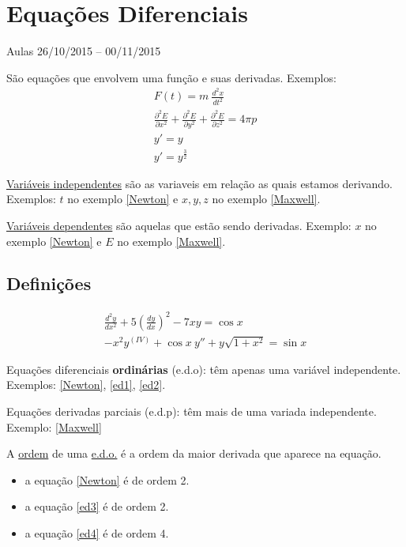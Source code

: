\documentclass[12pt,openany, letterpaper]{book}
\begin{document}
{{\chapter{Equações Diferenciais}{Aulas 26/10/2015 -- 00/11/2015}
\label{chap:c7}

\vspace{5mm}
São equações que envolvem uma função e suas derivadas. Exemplos: \begin{align}
    F(t) = m \ \frac{d^2x}{dt^2} \label{Newton} \\
    \frac{\partial^2 E}{\partial x^2} + \frac{\partial^2 E}{\partial y^2} + \frac{\partial^2 E}{\partial z^2} = 4\pi p \label{Maxwell} \\
    y' = y \label{ed1} \\
    y' = y^{\frac{3}{2}} \label{ed2}
\end{align}

\underline{Variáveis independentes} são as variaveis em relação as quais estamos derivando. Exemplos: $t$ no exemplo \ref{Newton} e $x, y, z$ no exemplo \ref{Maxwell}.

\underline{Variáveis dependentes} são aquelas que estão sendo derivadas. Exemplo: $x$ no exemplo \ref{Newton} e $E$ no exemplo \ref{Maxwell}.

\section{Definições}

\begin{align}
    \frac{d^2y}{d x^2} + 5          \left(\frac{dy}{dx}\right)^2 - 7xy = \cos x \label{ed3} \\
    -x^2y^{(IV)} + \cos x \ y'' + y\sqrt{1+x^2} = \sin x \label{ed4}
\end{align}

\hspace{5mm}Equações diferenciais \textbf{ordinárias} (e.d.o): têm apenas uma variável independente. Exemplos: \ref{Newton}, \ref{ed1}, \ref{ed2}.

Equações derivadas parciais (e.d.p): têm mais de uma variada independente. Exemplo: \ref{Maxwell}

A \underline{ordem} de uma \underline{e.d.o.} é a ordem da maior derivada que aparece na equação. \begin{itemize}
    \item a equação \ref{Newton} é de ordem 2.
    \item a equação \ref{ed3} é de ordem 2.
    \item a equação \ref{ed4} é de ordem 4.
\end{itemize}

}}
\end{document}
